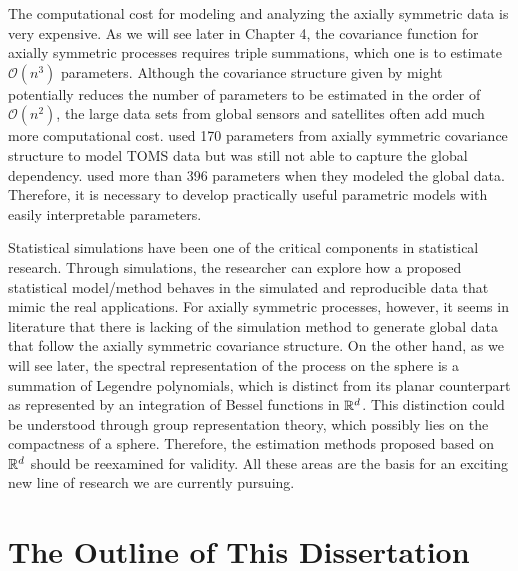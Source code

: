 The computational cost for modeling and analyzing the axially symmetric data is very expensive. As we will see later in Chapter 4, the covariance function for axially symmetric processes requires triple summations, which one is to estimate $\mathcal{O}(n^3)$ parameters. Although the covariance structure given by \cite{Huang2012} might potentially reduces the number of parameters to be estimated in the order of $\mathcal{O}(n^2)$, the large data sets from global sensors and satellites often add much more computational cost. \cite{Stein2007} used 170 parameters from axially symmetric covariance structure to model TOMS data but was still not able to capture the global dependency. \cite{CressieJohannesson2008} used more than 396 parameters when they modeled the global data. Therefore, it is necessary to develop practically useful parametric models with easily interpretable parameters. 

Statistical simulations have been one of the critical components in statistical research. Through simulations, the researcher can explore how a proposed statistical model/method behaves in the simulated and reproducible data that mimic the real applications. For axially symmetric processes, however, it seems in literature that there is lacking of the simulation method to generate global data that follow the axially symmetric covariance structure. On the other hand, as we will see later, the spectral representation of the process on the sphere is a summation of Legendre polynomials, which is distinct from its planar counterpart as represented by an integration of Bessel functions in $\mathbb{R}^d$. This distinction could be understood through group representation theory, which possibly lies on the compactness of a sphere. Therefore, the estimation methods proposed based on $\mathbb{R}^d$ should be reexamined for validity. All these areas are the basis for an exciting new line of research we are currently pursuing.\\

\section{The Outline of This Dissertation}

